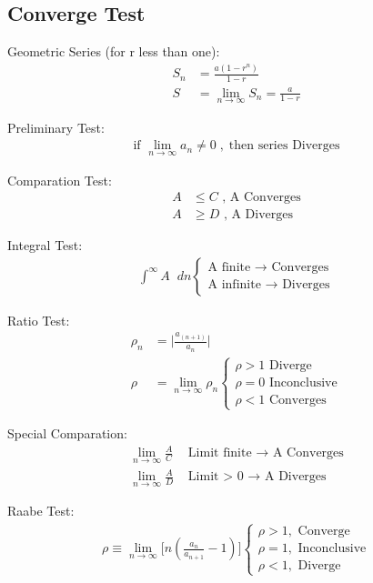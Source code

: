 \documentclass[../main.tex]{subfiles}
\begin{document}
\subsection*{Converge Test}
Geometric Series (for r less than one):
\begin{align*}
    S_n&=\frac{a(1-r^n)}{1-r}\\
    S&=\lim_{n \to \infty} S_n=\frac{a}{1-r}
\end{align*}

Preliminary Test:
\begin{align*}
    \text{if }\lim_{n \to \infty} a_n \neq 0\;,\;\text{then series Diverges}
\end{align*}

Comparation Test:
\begin{align*}
    A&\leq C\text{ , A Converges}\\
    A&\geq D\text{ , A Diverges}
\end{align*}

Integral Test:
\begin{align*}
    \int_{}^{\infty} A\;\;dn
    \begin{cases}
        \text{A finite $\rightarrow$ Converges}\\
        \text{A infinite $\rightarrow$ Diverges}
    \end{cases}
\end{align*}

Ratio Test:
\begin{align*}
    \rho_n&=\bigg \lvert \frac{a_{(n+1)}}{a_n} \bigg \rvert\\
    \rho&=\lim_{n\to \infty} \rho_n
    \begin{cases}
    \rho > 1 \text{ Diverge}\\
    \rho = 0 \text{ Inconclusive}\\
    \rho < 1 \text{ Converges}
    \end{cases}
\end{align*}

Special Comparation:
\begin{align*}
    \lim_{n\to \infty} \frac{A}{C}& \text{ Limit finite $\rightarrow$ A Converges}\\
    \lim_{n\to \infty} \frac{A}{D}& \text{ Limit > 0 $\rightarrow$ A Diverges}
\end{align*}

Raabe Test:
\begin{align*}
    \rho\equiv\lim_{n\to \infty} \bigg[n(\frac{a_n}{a_{n+1}}-1)\bigg]\begin{cases}
        \rho > 1,\textrm{ Converge}\\\rho = 1,\textrm{ Inconclusive}\\\rho < 1,\textrm{ Diverge}
    \end{cases}
\end{align*}
\end{document}
